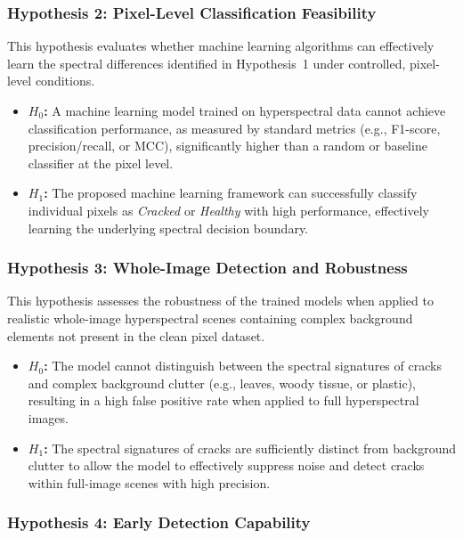 \subsubsection{Hypothesis 2: Pixel-Level Classification Feasibility}
\label{hyp:pixel_level_feasibility}

\noindent
This hypothesis evaluates whether machine learning algorithms can effectively learn the spectral differences identified in Hypothesis~1 under controlled, pixel-level conditions.

\begin{itemize}
    \item \textbf{$H_0$:} A machine learning model trained on hyperspectral data cannot achieve classification performance, as measured by standard metrics (e.g., F1-score, precision/recall, or MCC), significantly higher than a random or baseline classifier at the pixel level.
    \item \textbf{$H_1$:} The proposed machine learning framework can successfully classify individual pixels as \textit{Cracked} or \textit{Healthy} with high performance, effectively learning the underlying spectral decision boundary.
\end{itemize}

\subsubsection{Hypothesis 3: Whole-Image Detection and Robustness}
\label{hyp:whole_image_robustness}

\noindent
This hypothesis assesses the robustness of the trained models when applied to realistic whole-image hyperspectral scenes containing complex background elements not present in the clean pixel dataset.

\begin{itemize}
    \item \textbf{$H_0$:} The model cannot distinguish between the spectral signatures of cracks and complex background clutter (e.g., leaves, woody tissue, or plastic), resulting in a high false positive rate when applied to full hyperspectral images.
    \item \textbf{$H_1$:} The spectral signatures of cracks are sufficiently distinct from background clutter to allow the model to effectively suppress noise and detect cracks within full-image scenes with high precision.
\end{itemize}

\subsubsection{Hypothesis 4: Early Detection Capability}
\label{hyp:early_detection}

